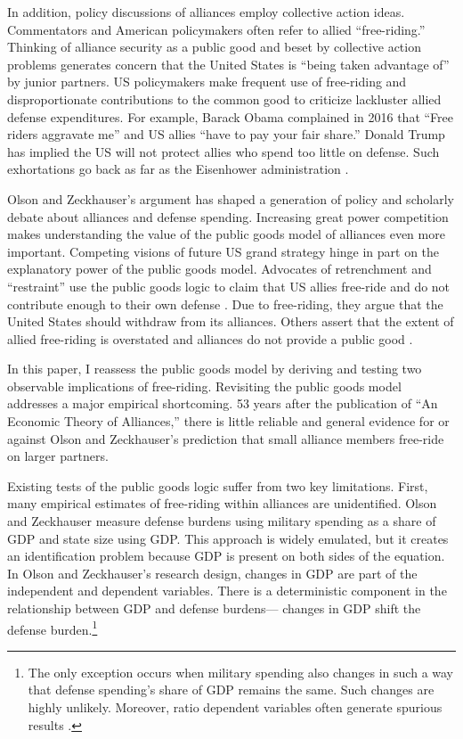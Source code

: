 \documentclass[12pt]{article}
\begin{document}
In addition, policy discussions of alliances employ collective action ideas.
Commentators and American policymakers often refer to allied ``free-riding.'' 
Thinking of alliance security as a public good and beset by collective action problems generates concern that the United States is ``being taken advantage of'' by junior partners. 
US policymakers make frequent use of free-riding and disproportionate contributions to the common good to criticize lackluster allied defense expenditures.  
For example, Barack Obama complained in 2016 that ``Free riders aggravate me'' and US allies ``have to pay your fair share.'' 
Donald Trump has implied the US will not protect allies who spend too little on defense. 
Such exhortations go back as far as the Eisenhower administration \citep{Lanoszka2015}.


Olson and Zeckhauser's argument has shaped a generation of policy and scholarly debate about alliances and defense spending. 
Increasing great power competition makes understanding the value of the public goods model of alliances even more important. 
Competing visions of future US grand strategy hinge in part on the explanatory power of the public goods model. 
Advocates of retrenchment and ``restraint'' use the public goods logic to claim that US allies free-ride and do not contribute enough to their own defense \citep{Preble2009, Posen2014}. 
Due to free-riding, they argue that the United States should withdraw from its alliances.
Others assert that the extent of allied free-riding is overstated and alliances do not provide a public good \citep{Brooksetal2013, BrandsFeaver2017}. 


In this paper, I reassess the public goods model by deriving and testing two observable implications of free-riding. 
Revisiting the public goods model addresses a major empirical shortcoming.
53 years after the publication of ``An Economic Theory of Alliances,'' there is little reliable and general evidence for or against Olson and Zeckhauser's prediction that small alliance members free-ride on larger partners. 


Existing tests of the public goods logic suffer from two key limitations.
First, many empirical estimates of free-riding within alliances are unidentified.
Olson and Zeckhauser measure defense burdens using military spending as a share of GDP and state size using GDP.
This approach is widely emulated, but it creates an identification problem because GDP is present on both sides of the equation.
In Olson and Zeckhauser's research design, changes in GDP are part of the independent and dependent variables. 
There is a deterministic component in the relationship between GDP and defense burdens--- changes in GDP shift the defense burden.\footnote{
The only exception occurs when military spending also changes in such a way that defense spending's share of GDP remains the same. Such changes are highly unlikely. Moreover, ratio dependent variables often generate spurious results \citep{Kronmal1993}.}  
 
\end{document}
